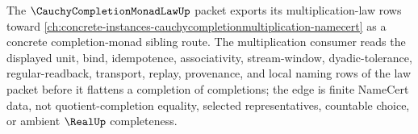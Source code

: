 The $\CauchyCompletionMonadLawUp$ packet exports its multiplication-law rows toward \autoref{ch:concrete-instances-cauchycompletionmultiplication-namecert} as a concrete completion-monad sibling route. The multiplication consumer reads the displayed unit, bind, idempotence, associativity, stream-window, dyadic-tolerance, regular-readback, transport, replay, provenance, and local naming rows of the law packet before it flattens a completion of completions; the edge is finite NameCert data, not quotient-completion equality, selected representatives, countable choice, or ambient $\RealUp$ completeness.
